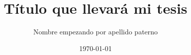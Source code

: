 





\makeatletter                       
	\def\printauthor{\@author}
	\def\printdate{\@date}
	\def\printtitle{\@title}
\makeatother

\providecommand{\keywords}[2][Palabras clave]{
  \small	
  \textbf{\textit{#1 ---}} #2
}




\title{Título que llevará mi tesis}
\date{\today}
\author{Nombre empezando por apellido paterno}

